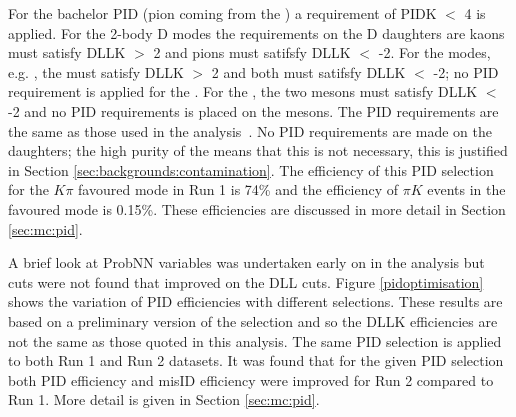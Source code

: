 For the bachelor PID (pion coming from the \Kstarm) a requirement of PIDK $<$ 4 is applied. For the 2-body D modes the requirements on the D daughters are kaons must satisfy DLLK $>$ 2 and pions must satifsfy DLLK $<$ -2. For the  modes, e.g. \decay{\Dz}{\Km\pip\pim\pip}, the \Km must satisfy DLLK $>$ 2 and both \pip must satifsfy DLLK $<$ -2; no PID requirement is applied for the \pip. For the \decay{\Dz}{\pip\pim\pip\pim}, the two \pip mesons must satisfy DLLK $<$ -2 and no PID requirements is placed on the \pim mesons. The PID requirements are the same as those used in the \decay{\Bp}{\D\Kp} analysis~\cite{LHCb-PAPER-2016-003}. No PID requirements are made on the \KS daughters; the high purity of the \KS means that this is not necessary, this is justified in Section \ref{sec:backgrounds:contamination}. The efficiency of this PID selection for the $K\pi$ favoured mode in Run 1 is 74\% and the efficiency of $\pi K$ events in the favoured mode is 0.15\%. These efficiencies are discussed in more detail in Section \ref{sec:mc:pid}. 


A brief look at ProbNN variables was undertaken early on in the analysis but cuts were not found that improved on the DLL cuts. Figure \ref{pidoptimisation} shows the variation of PID efficiencies with different selections. These results are based on a preliminary version of the selection and so the DLLK efficiencies are not the same as those quoted in this analysis.  The same PID selection is applied to both Run 1 and Run 2 datasets. It was found that for the given PID selection both PID efficiency and misID efficiency were improved for Run 2 compared to Run 1. More detail is given in Section \ref{sec:mc:pid}.

